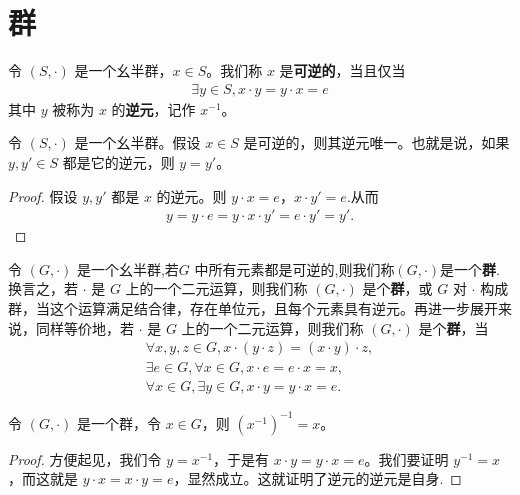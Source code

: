 \documentclass[../../main.tex]{subfiles}
\begin{document}
\section{群}

\begin{definition}
令 $(S, \cdot)$ 是一个幺半群，$x \in S$。我们称 $x$ 是\textbf{可逆的}，当且仅当
\begin{align*}
\exists y \in S, x \cdot y = y \cdot x = e
\end{align*}
其中 $y$ 被称为 $x$ 的\textbf{逆元}，记作 $x^{-1}$。 
\end{definition}

\begin{proposition}[逆元存在必唯一]
令 $(S, \cdot)$ 是一个幺半群。假设 $x \in S$ 是可逆的，则其逆元唯一。也就是说，如果 $y, y' \in S$ 都是它的逆元，则 $y = y'$。
\end{proposition}
\begin{proof}
假设 $y, y'$ 都是 $x$ 的逆元。则 $y \cdot x = e$，$x \cdot y' = e$.从而
\begin{align*}
y = y \cdot e = y \cdot x \cdot y' = e \cdot y' = y' .
\end{align*}
\end{proof}

\begin{definition}[群]
令 $(G, \cdot)$ 是一个幺半群,若$G$ 中所有元素都是可逆的,则我们称$(G,\cdot)$是一个\textbf{群}.换言之，若 $\cdot$ 是 $G$ 上的一个二元运算，则我们称 $(G, \cdot)$ 是个\textbf{群}，或 $G$ 对 $\cdot$ 构成群，当这个运算满足结合律，存在单位元，且每个元素具有逆元。再进一步展开来说，同样等价地，若 $\cdot$ 是 $G$ 上的一个二元运算，则我们称 $(G, \cdot)$ 是个\textbf{群}，当
\begin{gather*}
\forall x, y, z \in G, x \cdot (y \cdot z) = (x \cdot y) \cdot z ,\\
\exists e \in G, \forall x \in G, x \cdot e = e \cdot x = x ,\\
\forall x \in G, \exists y \in G, x \cdot y = y \cdot x = e .
\end{gather*} 
\end{definition}

\begin{proposition}
令 $(G, \cdot)$ 是一个群，令 $x \in G$，则 $(x^{-1})^{-1} = x$。
\end{proposition}
\begin{proof}
方便起见，我们令 $y = x^{-1}$，于是有 $x \cdot y = y \cdot x = e$。我们要证明 $y^{-1} = x$，而这就是 $y \cdot x = x \cdot y = e$，显然成立。这就证明了逆元的逆元是自身.
\end{proof}
\end{document}
